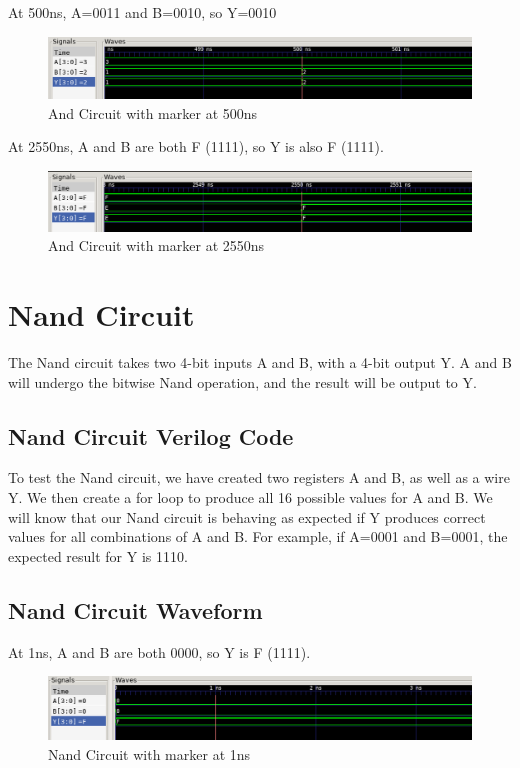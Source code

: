 \documentclass[12pt]{article}
\begin{document}
At 500ns, A=0011 and B=0010, so Y=0010
 \begin{figure}[H]
 \centering 
\includegraphics[width = 1.0\textwidth]{And/and_wave1.png}
 \caption{And Circuit with marker at 500ns}
 \label{fig:enter-label}
 \end{figure}

At 2550ns, A and B are both F (1111), so Y is also F (1111).
 \begin{figure}[H]
 \centering 
\includegraphics[width = 1.0\textwidth]{And/and_wave2.png}
 \caption{And Circuit with marker at 2550ns}
 \label{fig:enter-label}
 \end{figure}

\section{Nand Circuit}

The Nand circuit takes two 4-bit inputs A and B, with a 4-bit output Y. A and B will undergo the bitwise Nand operation, and the result will be output to Y.

\subsection{Nand Circuit Verilog Code} 
 

To test the Nand circuit, we have created two registers A and B, as well as a wire Y. We then create a for loop to produce all 16 possible values for A and B. We will know that our Nand circuit is behaving as expected if Y produces correct values for all combinations of A and B. For example, if A=0001 and B=0001, the expected result for Y is 1110. 
 

\subsection{Nand Circuit Waveform} 

At 1ns, A and B are both 0000, so Y is F (1111).
\begin{figure}[H]
 \centering
 \includegraphics[width = 1.0\textwidth]{Nand/nand_wave.png}
 \caption{Nand Circuit with marker at 1ns}
 \label{fig:enter-label} 
\end{figure} 
\end{document}
